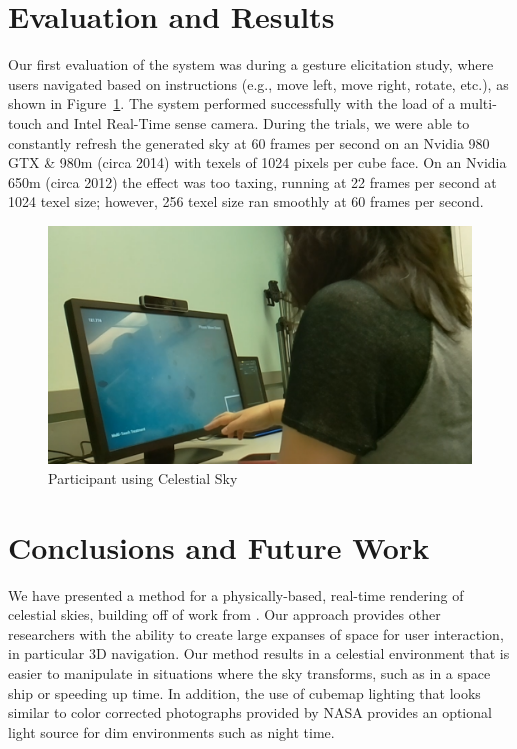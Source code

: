 \documentclass{vgtc}                          %
\begin{document}
\section{Evaluation and Results}

Our first evaluation of the system was during a gesture elicitation study, where users navigated based on instructions (e.g., move left, move right, rotate, etc.), as shown in Figure~\ref{fig:expphoto}. The system performed successfully with the load of a multi-touch and Intel Real-Time sense camera. During the trials, we were able to constantly refresh the generated sky at 60 frames per second on an Nvidia 980 GTX \& 980m (circa 2014) with texels of 1024 pixels per cube face. On an Nvidia 650m (circa 2012) the effect was too taxing, running at 22 frames per second at 1024 texel size; however, 256 texel size ran smoothly at 60 frames per second.

\begin{figure}[bth]
  \centering
  \includegraphics[width=0.8\columnwidth]{../images/experiment-photo}
  \caption{Participant using Celestial Sky}
  \label{fig:expphoto}
\end{figure}
\section{Conclusions and Future Work}



We have presented a method for a physically-based, real-time rendering of celestial skies, building off of work from \cite{Jensen:2001fr}. Our approach provides other researchers with the ability to create large expanses of space for user interaction, in particular 3D navigation. Our method results in a celestial environment that is easier to manipulate in situations where the sky transforms, such as in a space ship or speeding up time. In addition, the use of cubemap lighting that looks similar to color corrected photographs provided by NASA provides an optional light source for dim environments such as night time.
\end{document}
